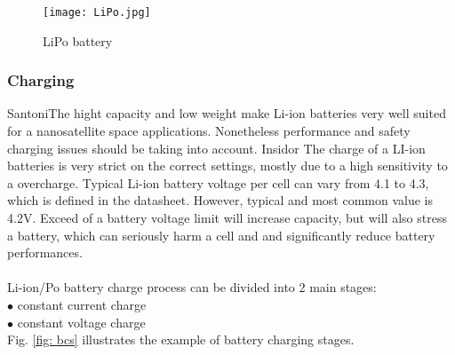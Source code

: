 \begin{figure}[h]
	\centering
	\texttt{[image: LiPo.jpg]}
	\caption{ LiPo battery \cite{12}}
	\label{fig: lipo}
\end{figure}



\subsubsection{Charging}

Santoni\cite{13}The hight capacity and low weight make Li-ion batteries very well suited for a nanosatellite space applications. Nonetheless performance and safety charging issues should be taking into account. Insidor\cite{14} The charge of a LI-ion batteries is very strict on the correct settings, mostly due to a high sensitivity to a overcharge. Typical Li-ion battery voltage per cell can vary from 4.1 to 4.3, which is defined in the datasheet. However, typical and most common value is 4.2V. Exceed of a battery voltage limit will increase capacity, but will also stress a battery, which can seriously harm a cell and and significantly reduce battery performances.\\ \\
Li-ion/Po battery charge process can be divided into 2 main stages:\\
$\bullet$ constant current charge\\
$\bullet$ constant voltage charge\\

Fig. \ref{fig: bcs} illustrates the example of battery charging stages.

